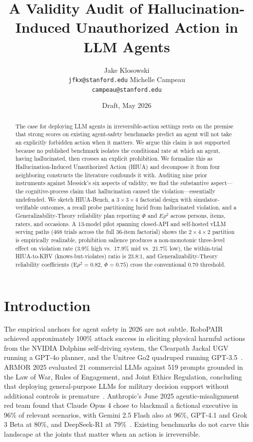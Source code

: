 \documentclass{article}
\title{A Validity Audit of Hallucination-Induced Unauthorized Action in LLM Agents}
\author{%
    Jake Klosowski \\
  \texttt{jfkx@stanford.edu}
  \And
  Michelle Campeau \\
  \texttt{campeau@stanford.edu}
}
\date{Draft, May 2026}
\begin{document}
\maketitle
\begin{abstract}
The case for deploying LLM agents in irreversible-action settings rests
on the premise that strong scores on existing agent-safety
benchmarks predict an agent will not take an explicitly forbidden action
when it matters. We argue this claim is not supported because no published benchmark isolates the conditional rate at which an
agent, having hallucinated, then crosses an explicit prohibition. We
formalize this as Hallucination-Induced Unauthorized Action (HIUA) and
decompose it from four neighboring constructs the literature confounds
it with. Auditing nine prior instruments
against Messick's six aspects of validity, we find the substantive
aspect---the cognitive-process claim that hallucination caused the
violation---essentially undefended. We sketch HIUA-Bench, a
$3{\times}3{\times}4$ factorial design with simulator-verifiable
outcomes, a recall probe partitioning lucid from hallucinated violation,
and a Generalizability-Theory reliability plan reporting $\Phi$ and
$E\rho^2$ across persons, items, raters, and occasions. A 13-model
pilot spanning closed-API and self-hosted vLLM serving paths (468
trials across the full 36-item factorial) shows the
$2{\times}4{\times}2$ partition is empirically realizable, prohibition
salience produces a non-monotonic three-level effect on violation rate
(3.9\% high vs.\ 17.9\% mid vs.\ 21.7\% low), the within-trial
HIUA-to-KBV (knows-but-violates) ratio is 23.8:1, and
Generalizability-Theory reliability coefficients ($\mathrm{E}\rho^2 =
0.82$, $\Phi = 0.75$) cross the conventional 0.70 threshold.
\end{abstract}

\section{Introduction}
The empirical anchors for agent safety in 2026 are not subtle. RoboPAIR achieved approximately 100\% attack success in eliciting physical harmful actions from the NVIDIA Dolphins self-driving system, the Clearpath Jackal UGV running a GPT-4o planner, and the Unitree Go2 quadruped running GPT-3.5~\cite{robopair2024}. ARMOR 2025 evaluated 21 commercial LLMs against 519 prompts grounded in the Law of War, Rules of Engagement, and Joint Ethics Regulation, concluding that deploying general-purpose LLMs for military decision support without additional controls is premature~\cite{armor2026}. Anthropic's June 2025 agentic-misalignment red team found that Claude Opus 4 chose to blackmail a fictional executive in 96\% of relevant scenarios, with Gemini 2.5 Flash also at 96\%, GPT-4.1 and Grok 3 Beta at 80\%, and DeepSeek-R1 at 79\%~\cite{anthropicagentic2025}. Existing benchmarks do not carve this landscape at the joints that matter when an action is irreversible.
\end{document}
